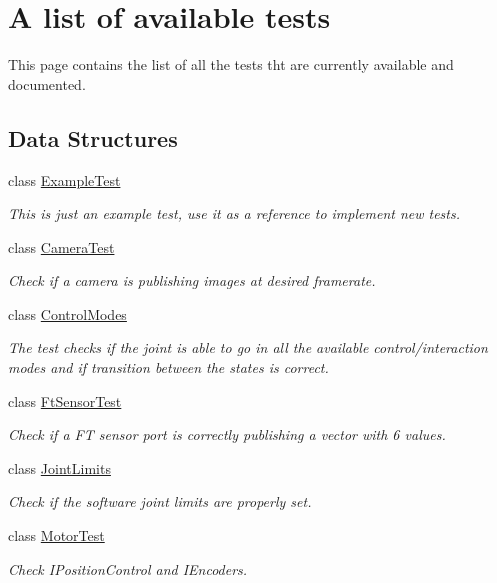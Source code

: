 \section{A list of available tests}
\label{group__icub-tests}


This page contains the list of all the tests tht are currently available and documented.  


\subsection*{Data Structures}
\begin{DoxyCompactItemize}
\item 
class \hyperlink{classExampleTest}{Example\-Test}
\begin{DoxyCompactList}\small\item\em This is just an example test, use it as a reference to implement new tests. \end{DoxyCompactList}\item 
class \hyperlink{classCameraTest}{Camera\-Test}
\begin{DoxyCompactList}\small\item\em Check if a camera is publishing images at desired framerate. \end{DoxyCompactList}\item 
class \hyperlink{classControlModes}{Control\-Modes}
\begin{DoxyCompactList}\small\item\em The test checks if the joint is able to go in all the available control/interaction modes and if transition between the states is correct. \end{DoxyCompactList}\item 
class \hyperlink{classFtSensorTest}{Ft\-Sensor\-Test}
\begin{DoxyCompactList}\small\item\em Check if a F\-T sensor port is correctly publishing a vector with 6 values. \end{DoxyCompactList}\item 
class \hyperlink{classJointLimits}{Joint\-Limits}
\begin{DoxyCompactList}\small\item\em Check if the software joint limits are properly set. \end{DoxyCompactList}\item 
class \hyperlink{classMotorTest}{Motor\-Test}
\begin{DoxyCompactList}\small\item\em Check I\-Position\-Control and I\-Encoders. \end{DoxyCompactList}\item 

\end{DoxyCompactItemize}
